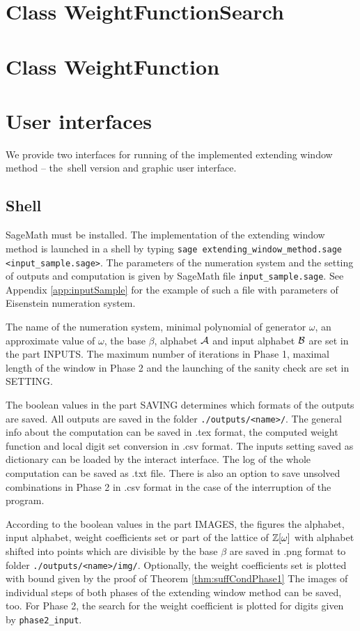 \section{Class WeightFunctionSearch}



\section{Class WeightFunction}


\section{User interfaces}
We provide two interfaces for running of the implemented extending window method -- the~shell version and graphic user interface.

\subsection{Shell}
SageMath must be installed. The implementation of the extending window method is launched in a shell by typing \verb+sage extending_window_method.sage <input_sample.sage>+. The parameters of the numeration system and the setting of outputs and computation is given by SageMath file \verb+input_sample.sage+. See Appendix \ref{app:inputSample} for the example of such a file with parameters of Eisenstein numeration system.

The name of the numeration system, minimal polynomial of generator $\omega$, an approximate value of $\omega$, the base $\beta$, alphabet $\mathcal{A}$ and input alphabet $\mathcal{B}$ are set in the part INPUTS. The maximum number of iterations in Phase 1, maximal length of the window in Phase 2 and the launching of the sanity check are set in SETTING. 

The boolean values in the part SAVING determines which formats of the outputs are saved. All outputs are saved in the folder \verb+./outputs/<name>/+. The general info about the computation can be saved in .tex format, the computed weight function and local digit set conversion in .csv format. The inputs setting saved as dictionary can be loaded by the interact interface. The log of the whole computation can be saved as .txt file. There is also an option to save unsolved combinations in Phase 2 in .csv format in the case of the interruption of the program.

According to the boolean values in the part IMAGES, the figures the alphabet, input alphabet, weight coefficients set or part of the lattice of $\mathbb{Z}[\omega]$ with alphabet shifted into points which are divisible by the base $\beta$ are saved in .png format to folder \verb+./outputs/<name>/img/+. Optionally, the weight coefficients set is plotted with bound given by the proof of Theorem \ref{thm:suffCondPhase1} The images of individual steps of both phases of the extending window method can be saved, too. For Phase 2, the search for the weight coefficient  is plotted for digits given by \verb+phase2_input+.  

